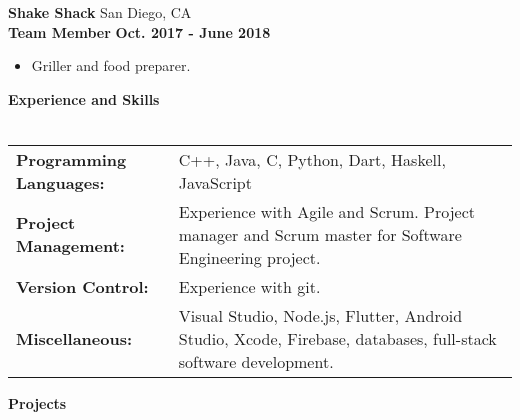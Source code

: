 \documentclass[a4paper]{article}
\newcommand{\lineunder} {
    \vspace*{-8pt} \\
    \hspace*{-18pt} \hrulefill \\
}
\newcommand{\header} [1] {
    {\hspace*{-18pt}\vspace*{6pt}\LARGE \textbf{#1}}
    \vspace*{-6pt} \lineunder
}
\begin{document}
\textbf{Shake Shack} \hfill San Diego, CA\\
\hspace{4mm} \textbf{Team Member} \hfill \textbf{Oct. 2017 - June 2018}\\
\vspace{-2mm}
\begin{itemize} \itemsep 1pt
	\item Griller and food preparer.
\end{itemize}

\header{Experience and Skills}
\vspace{1mm}

\def\arraystretch{1.25}
\begin{tabular}{ l p{.69\linewidth} }
	\hspace*{-3.28mm} \textbf{Programming Languages:} & C++, Java, C, Python, Dart, Haskell, JavaScript                                                                                \\
	\hspace*{-3.28mm} \textbf{Project Management:}   & Experience with Agile and Scrum. Project manager and Scrum master for Software Engineering project. \\
	\hspace*{-3.28mm} \textbf{Version Control:}       & Experience with git.\\
    \hspace*{-3.28mm} \textbf{Miscellaneous:}       & Visual Studio, Node.js, Flutter, Android Studio, Xcode, Firebase, databases, full-stack software development.                                                                                              \\
\end{tabular}
\vspace{2mm}

\header{Projects}
\vspace{1mm}


\end{document}
